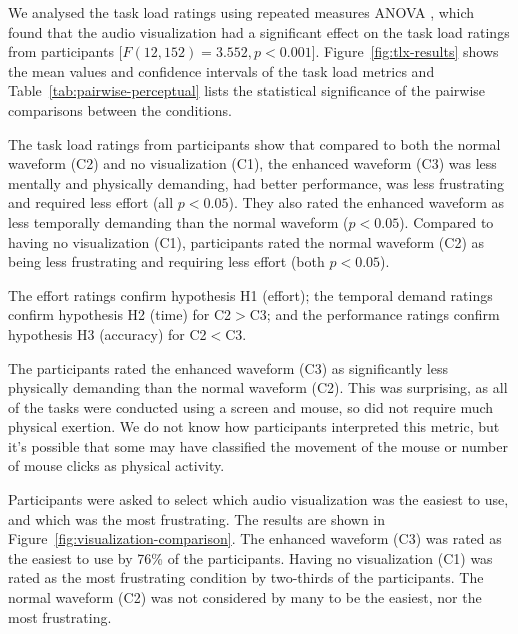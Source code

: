 We analysed the task load ratings using repeated measures ANOVA \citep[p.~409]{Shalabh2009}, which found that the audio
visualization had a significant effect on the task load ratings from participants [$F(12,152)=3.552, p<0.001$].
Figure~\ref{fig:tlx-results} shows the mean values and confidence intervals of the task load metrics and
Table~\ref{tab:pairwise-perceptual} lists the statistical significance of the pairwise comparisons between the
conditions.

The task load ratings from participants show that compared to both the normal waveform (C2) and no visualization (C1),
the enhanced waveform (C3) was less mentally and physically demanding, had better performance, was less frustrating and
required less effort (all $p<0.05$).  They also rated the enhanced waveform as less temporally demanding than the normal
waveform ($p<0.05$).  Compared to having no visualization (C1), participants rated the normal waveform (C2) as being
less frustrating and requiring less effort (both $p<0.05$). 

The effort ratings confirm hypothesis H1 (effort); the temporal demand ratings confirm hypothesis H2 (time) for
C2$>$C3; and the performance ratings confirm hypothesis H3 (accuracy) for C2$<$C3.



The participants rated the enhanced waveform (C3) as significantly less physically demanding than the normal waveform
(C2).  This was surprising, as all of the tasks were conducted using a screen and mouse, so did not require much
physical exertion.  We do not know how participants interpreted this metric, but it's possible that some may have
classified the movement of the mouse or number of mouse clicks as physical activity.

Participants were asked to select which audio visualization was the easiest to use, and which was the most frustrating.
The results are shown in Figure~\ref{fig:visualization-comparison}.  The enhanced waveform (C3) was rated as the
easiest to use by 76\% of the participants.  Having no visualization (C1) was rated as the most frustrating condition
by two-thirds of the participants. The normal waveform (C2) was not considered by many to be the easiest, nor the most
frustrating.

